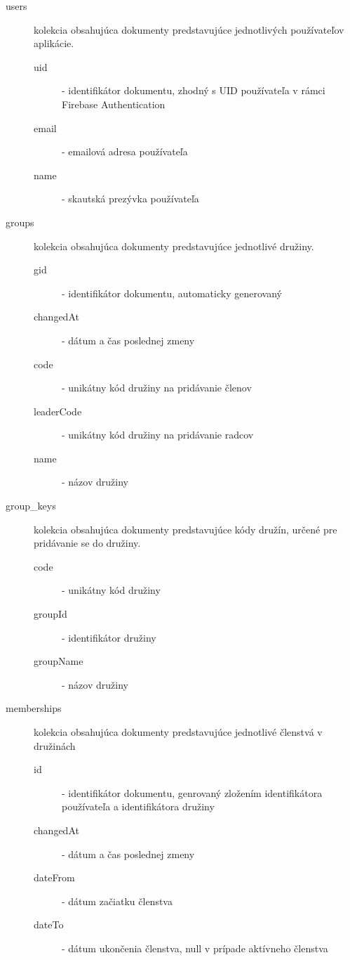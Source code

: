 \begin{description}
    \item[users] kolekcia obsahujúca dokumenty predstavujúce jednotlivých používateľov aplikácie.
        \begin{description}
            \item[uid] - identifikátor dokumentu, zhodný s UID používateľa v rámci Firebase Authentication
            \item[email] - emailová adresa používateľa
            \item[name] - skautská prezývka používateľa
        \end{description}
    \item[groups] kolekcia obsahujúca dokumenty predstavujúce jednotlivé družiny.
        \begin{description}
            \item[gid] - identifikátor dokumentu, automaticky generovaný
            \item[changedAt] - dátum a čas poslednej zmeny
            \item[code] - unikátny kód družiny na pridávanie členov
            \item[leaderCode] - unikátny kód družiny na pridávanie radcov
            \item[name] - názov družiny
        \end{description}
    \item[group\_keys] kolekcia obsahujúca dokumenty predstavujúce kódy družín, určené pre pridávanie se do družiny.
        \begin{description}
            \item[code] - unikátny kód družiny
            \item[groupId] - identifikátor družiny
            \item[groupName] - názov družiny
        \end{description}
    \item[memberships] kolekcia obsahujúca dokumenty predstavujúce jednotlivé členstvá v družinách
        \begin{description}
            \item[id] - identifikátor dokumentu, genrovaný zložením identifikátora používateľa a identifikátora družiny
            \item[changedAt] - dátum a čas poslednej zmeny
            \item[dateFrom] - dátum začiatku členstva
            \item[dateTo] - dátum ukončenia členstva, null v prípade aktívneho členstva

\end{description}
\end{description}
